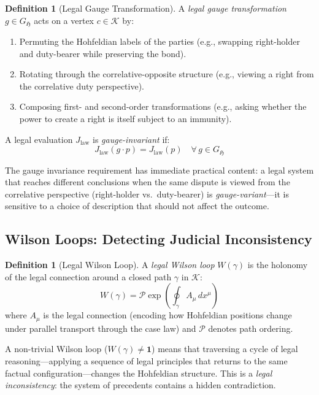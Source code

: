 \documentclass[12pt]{article}
\theoremstyle{definition}
\newtheorem{definition}[theorem]{Definition}
\theoremstyle{remark}
\newcommand{\Ho}{\mathfrak{H}}             %
\begin{document}
\begin{definition}[Legal Gauge Transformation]
A \emph{legal gauge transformation} $g \in G_{\Ho}$ acts on a vertex $c \in \mathcal{K}$ by:
\begin{enumerate}
    \item Permuting the Hohfeldian labels of the parties (e.g., swapping right-holder and duty-bearer while preserving the bond).
    \item Rotating through the correlative-opposite structure (e.g., viewing a right from the correlative duty perspective).
    \item Composing first- and second-order transformations (e.g., asking whether the power to create a right is itself subject to an immunity).
\end{enumerate}
A legal evaluation $J_{\text{law}}$ is \emph{gauge-invariant} if:
\begin{equation}
J_{\text{law}}(g \cdot p) = J_{\text{law}}(p) \quad \forall\, g \in G_{\Ho}
\label{eq:gauge_inv}
\end{equation}
\end{definition}

The gauge invariance requirement has immediate practical content: a legal system that reaches different conclusions when the same dispute is viewed from the correlative perspective (right-holder vs.\ duty-bearer) is \emph{gauge-variant}---it is sensitive to a choice of description that should not affect the outcome.

\subsection{Wilson Loops: Detecting Judicial Inconsistency}

\begin{definition}[Legal Wilson Loop]
A \emph{legal Wilson loop} $W(\gamma)$ is the holonomy of the legal connection around a closed path $\gamma$ in $\mathcal{K}$:
\begin{equation}
W(\gamma) = \mathcal{P} \exp\left( \oint_\gamma A_\mu\, dx^\mu \right)
\label{eq:wilson}
\end{equation}
where $A_\mu$ is the legal connection (encoding how Hohfeldian positions change under parallel transport through the case law) and $\mathcal{P}$ denotes path ordering.
\end{definition}

A non-trivial Wilson loop ($W(\gamma) \neq \mathbf{1}$) means that traversing a cycle of legal reasoning---applying a sequence of legal principles that returns to the same factual configuration---changes the Hohfeldian structure.  This is a \emph{legal inconsistency}: the system of precedents contains a hidden contradiction.
\end{document}
